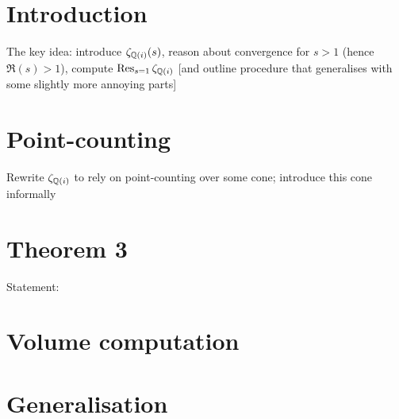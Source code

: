 \documentclass[11pt]{article}
\begin{document}
\section{Introduction}
The key idea: introduce $\zeta_{\mathbb{Q}(i)}(s)$, reason about convergence for $s > 1$ (hence $\Re(s) > 1$), compute $\operatorname{Res}_{s = 1}\zeta_{\mathbb{Q}(i)}$ [and outline procedure that generalises with some slightly more annoying parts]

\section{Point-counting}
Rewrite $\zeta_{\mathbb{Q}(i)}$ to rely on point-counting over some cone; introduce this cone informally

\section{Theorem 3}
Statement: 

\section{Volume computation}

\section{Generalisation}
\end{document}
